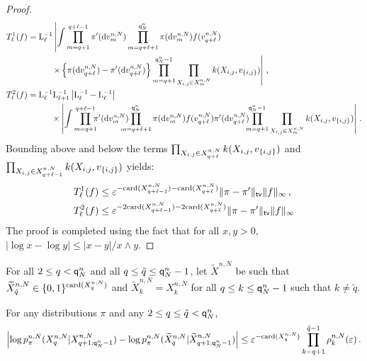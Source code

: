 \begin{proof}
\begin{align*}
T^1_{\ell}(f) &= \mathrm{L}_{\ell}^{-1}\left|\int \prod_{m=q+1}^{q+\ell-1}\pi'(\rmd v^{n,N}_m)\prod_{m=q+\ell+1}^{\ordermax{n}{N}}\pi(\rmd v^{n,N}_m)f(v_{q+\ell}^{n,N})\right.\\
&\hspace{1cm}\left.\times\left\{\pi(\rmd v_{q+\ell}^{n,N})-\pi'(\rmd v_{q+\ell}^{n,N})\right\}\prod_{m=q+1}^{\ordermax{n}{N}-1}\prod_{X_{i,j}\in X^{n,N}_m}\condlik(X_{i,j},v_{\{i,j\}})\right|\eqsp,\\
T^2_{\ell}(f) &= \mathrm{L}_{\ell}^{-1}\mathrm{L}_{\ell+1}^{-1}\left|\mathrm{L}_{\ell}^{-1}-\mathrm{L}_{\ell}^{-1}\right|\\
& \hspace{1cm}\times\left|\int \prod_{m=q+1}^{q+\ell-1}\hspace{-.2cm}\pi'(\rmd v^{n,N}_m)\hspace{-.4cm}\prod_{m=q+\ell+1}^{\ordermax{n}{N}}\pi(\rmd v^{n,N}_m)f(v_{q+\ell}^{n,N})\pi'(\rmd v_{q+\ell}^{n,N})\hspace{-.2cm}\prod_{m=q+1}^{\ordermax{n}{N}-1}\prod_{X_{i,j}\in X^{n,N}_m}\condlik(X_{i,j},v_{\{i,j\}})\right|\eqsp.
\end{align*}
Bounding above and below the terms $\prod_{X_{i,j}\in X^{n,N}_{q+\ell}}k(X_{i,j},v_{\{i,j\}})$ and $\prod_{X_{i,j}\in X^{n,N}_{q+\ell-1}}k(X_{i,j},v_{\{i,j\}})$ yields:
\begin{align*}
T^1_{\ell}(f)  &\le \varepsilon^{-\mathrm{card}(X^{n,N}_{q+\ell-1})-\mathrm{card}(X^{n,N}_{q+\ell})}\|\pi-\pi'\|_{\mathsf{tv}}\|f\|_{\infty}\,,\\
T^2_{\ell}(f)  &\le \varepsilon^{-2\mathrm{card}(X^{n,N}_{q+\ell-1})-2\mathrm{card}(X^{n,N}_{q+\ell})}\|\pi-\pi'\|_{\mathsf{tv}}\|f\|_{\infty}
\end{align*}
The proof is completed using the fact that 
for all $x,y>0$, $|\log x - \log y| \le |x-y|/x\wedge y$. 
\end{proof}
For all $2\le q< {\mathsf{q}}^{n}_{N}$ and all $q\le \tilde{q}\le {\mathsf{q}}^{n}_{N}-1$, let $\widetilde{X}^{n,N}$ be  such that $\widetilde{X}_{\tilde{q}}^{n,N}\in \{0,1\}^{\mathrm{card}(X_q^{n,N})}$ and $\widetilde{X}_k^{n,N} = X_k^{n,N}$ for all $q\le k\le {\mathsf{q}}^{n}_{N}-1$ such that $k\neq \tilde{q}$. 
\begin{lemma}
For any distributions $\pi$ and any $2\le q\le \tilde{q}<{\mathsf{q}}^{n}_{N}$,
\[
\left|\log p_{\pi}^{n,N}(X_{q}^{n,N}|X_{q+1:{\mathsf{q}}^{n}_{N}-1}^{n,N}) - \log p_{\pi}^{n,N}(\widetilde{X}_{q}^{n,N}|\widetilde{X}_{q+1:{\mathsf{q}}^{n}_{N}-1}^{n,N})\right| \leq \varepsilon^{-\mathrm{card}(X^{n,N}_{q})}\prod_{k = q+1}^{\tilde{q}-1}\rho^{n,N}_k(\varepsilon)\,.
\]
\end{lemma}
